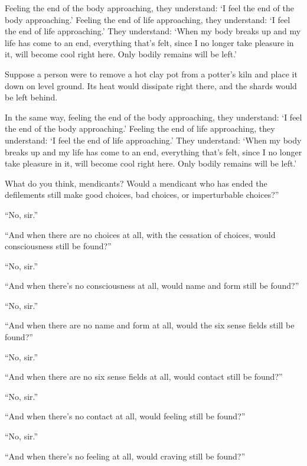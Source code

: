 \documentclass[12pt,openany]{book}%
\begin{document}
Feeling the end of the body approaching, they understand: ‘I feel the end of the body approaching.’ Feeling the end of life approaching, they understand: ‘I feel the end of life approaching.’ They understand: ‘When my body breaks up and my life has come to an end, everything that’s felt, since I no longer take pleasure in it, will become cool right here. Only bodily remains will be left.’ 

Suppose a person were to remove a hot clay pot from a potter’s kiln and place it down on level ground. Its heat would dissipate right there, and the shards would be left behind. 

In the same way, feeling the end of the body approaching, they understand: ‘I feel the end of the body approaching.’ Feeling the end of life approaching, they understand: ‘I feel the end of life approaching.’ They understand: ‘When my body breaks up and my life has come to an end, everything that’s felt, since I no longer take pleasure in it, will become cool right here. Only bodily remains will be left.’ 

What do you think, mendicants? Would a mendicant who has ended the defilements still make good choices, bad choices, or imperturbable choices?” 

“No, sir.” 

“And when there are no choices at all, with the cessation of choices, would consciousness still be found?” 

“No, sir.” 

“And when there’s no consciousness at all, would name and form still be found?” 

“No, sir.” 

“And when there are no name and form at all, would the six sense fields still be found?” 

“No, sir.” 

“And when there are no six sense fields at all, would contact still be found?” 

“No, sir.” 

“And when there’s no contact at all, would feeling still be found?” 

“No, sir.” 

“And when there’s no feeling at all, would craving still be found?” 
\end{document}

